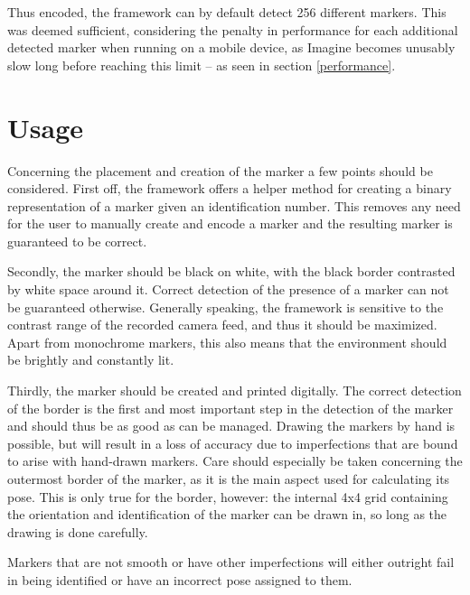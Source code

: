 Thus encoded, the framework can by default detect 256 different markers.
This was deemed sufficient, considering the penalty in performance for each additional detected marker when running on a mobile device, as Imagine becomes unusably slow long before reaching this limit – as seen in section \ref{performance}.

\section{Usage}

Concerning the placement and creation of the marker a few points should be considered.
First off, the framework offers a helper method for creating a binary representation of a marker given an identification number.
This removes any need for the user to manually create and encode a marker and the resulting marker is guaranteed to be correct.

Secondly, the marker should be black on white, with the black border contrasted by white space around it.
Correct detection of the presence of a marker can not be guaranteed otherwise.
Generally speaking, the framework is sensitive to the contrast range of the recorded camera feed, and thus it should be maximized.
Apart from monochrome markers, this also means that the environment should be brightly and constantly lit.

Thirdly, the marker should be created and printed digitally.
The correct detection of the border is the first and most important step in the detection of the marker and should thus be as good as can be managed.
Drawing the markers by hand is possible, but will result in a loss of accuracy due to imperfections that are bound to arise with hand-drawn markers.
Care should especially be taken concerning the outermost border of the marker, as it is the main aspect used for calculating its pose.
This is only true for the border, however: the internal 4x4 grid containing the orientation and identification of the marker can be drawn in, so long as the drawing is done carefully.

Markers that are not smooth or have other imperfections will either outright fail in being identified or have an incorrect pose assigned to them.
